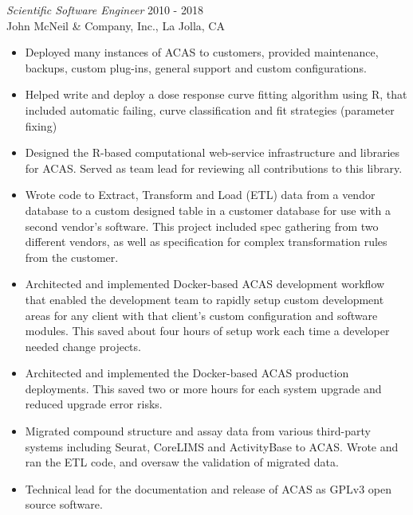\documentclass[margin, 10pt]{res} %
\begin{document}
\begin{resume}
{\sl Scientific Software Engineer} \hfill 2010 - 2018  \\
John McNeil \& Company, Inc., La Jolla, CA 
\begin{itemize}
\item Deployed many instances of ACAS to customers, provided maintenance, backups, custom plug-ins, general support and custom configurations.
\item Helped write and deploy a dose response curve fitting algorithm using R, that included automatic failing, curve classification and fit strategies (parameter fixing)
\item Designed the R-based computational web-service infrastructure and libraries for ACAS. Served as team lead for reviewing all contributions to this library.
\item Wrote code to Extract, Transform and Load (ETL) data from a vendor database to a custom designed table in a customer database for use with a second vendor’s software. This project included spec gathering from two different vendors, as well as specification for complex transformation rules from the customer.
\item Architected and implemented Docker-based ACAS development workflow that enabled the development team to rapidly setup custom development areas for any client with that client’s custom configuration and software modules. This saved about four hours of setup work each time a developer needed change projects.
\item Architected and implemented the Docker-based ACAS production deployments. This saved two or more hours for each system upgrade and reduced upgrade error risks.
\item Migrated compound structure and assay data from various third-party systems including Seurat, CoreLIMS and ActivityBase to ACAS. Wrote and ran the ETL code, and oversaw the validation of migrated data.
\item Technical lead for the documentation and release of ACAS as GPLv3 open source software. 
\end{itemize} 



\end{resume}
\end{document}
